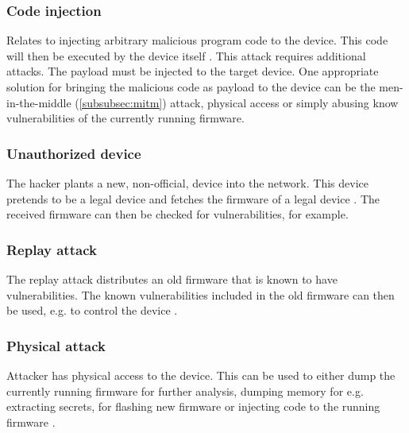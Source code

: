 \subsubsection{Code injection}\label{subsubsec:code-injection}
Relates to injecting arbitrary malicious program code to the device. This code will then be executed by the device itself \cite{7459331} \cite{Bettayeb2019}. This attack requires additional attacks. The payload must be injected to the target device. One appropriate solution for bringing the malicious code as payload to the device can be the men-in-the-middle (\ref{subsubsec:mitm}) attack, physical access or simply abusing know vulnerabilities of the currently running firmware.

\subsubsection{Unauthorized device}\label{subsubsec:unauthorized-device}
The hacker plants a new, non-official, device into the network. This device pretends to be a legal device and fetches the firmware of a legal device \cite{Bettayeb2019}. The received firmware can then be checked for vulnerabilities, for example.

\subsubsection{Replay attack}\label{subsubsec:replay-attack}
The replay attack distributes an old firmware that is known to have vulnerabilities. The known vulnerabilities included in the old firmware can then be used, e.g. to control the device \cite{Adams2011} \cite{Zandberg2019}.

\subsubsection{Physical attack}\label{subsubsec:physical-attack}
Attacker has physical access to the device. This can be used to either dump the currently running firmware for further analysis, dumping memory for e.g. extracting secrets, for flashing new firmware or injecting code to the running firmware \cite{Lethaby2018}.
